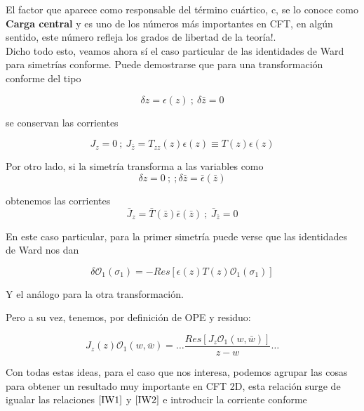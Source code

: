 \documentclass[]{article}
\begin{document}
\noindent El factor que aparece como responsable del término cuártico, c, se lo conoce como \textbf{Carga central} y es uno de los números más importantes en CFT, en algún sentido, este número refleja los grados de libertad de la teoría!.\\

Dicho todo esto, veamos ahora sí el caso particular de las identidades de Ward para simetrías conforme. Puede demostrarse que para una transformación conforme del tipo
 
\begin{equation}
\delta z = \epsilon(z) \ ; \ \delta \bar{z} = 0
\end{equation}

\noindent se conservan las corrientes 

\begin{equation}\label{Jz}
J_z=0 \ ; \ J_{\bar{z}}=T_{zz}(z)\epsilon(z)\equiv T(z)\epsilon(z)
\end{equation}

\noindent Por otro lado, si la simetría transforma a las variables como 
\begin{equation}\label{key}
\delta z = 0 \ ; \ ; \delta \bar{z} = \bar{\epsilon}(\bar{z})
\end{equation}

\noindent obtenemos las corrientes
\begin{equation}\label{key}
\bar{J}_z=\bar{T}(\bar{z})\bar{\epsilon}(\bar{z}) \ ; \ \bar{J}_{\bar{z}}=0
\end{equation} 

En este caso particular, para la primer simetría puede verse que las identidades de Ward nos dan

\begin{equation}\label{IW1}
\delta \mathcal{O}_1(\sigma_1) = -Res\left[\epsilon(z)T(z)\mathcal{O}_1(\sigma_1)\right]
\end{equation}

\noindent Y el análogo para la otra transformación.

Pero a su vez, tenemos, por definición de OPE y residuo:

\begin{equation}\label{IW2}
J_z(z)\mathcal{O}_1(w,\bar{w})=\dots \frac{Res\left[J_z\mathcal{O}_1(w,\bar{w})\right]}{z-w} \dots
\end{equation}


\noindent Con todas estas ideas, para el caso que nos interesa, podemos agrupar las cosas para obtener un resultado muy importante en CFT 2D, esta relación surge de igualar las relaciones $ \ref{IW1} $ y $ \ref{IW2} $ e introducir la corriente conforme
\end{document}
